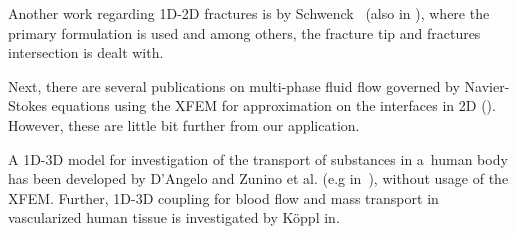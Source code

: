 Another work regarding 1D-2D fractures is by Schwenck~\cite{schwenck_xfem-based_2015} (also in \cite{schwenck_2015}), 
where the primary formulation is used and among others, the fracture tip and fractures intersection is dealt with.

Next, there are several publications on multi-phase fluid flow governed by Navier-Stokes equations using the XFEM for
approximation on the interfaces in 2D (\cite{diez_stable_2013,sauerland_stable_2013}). However, these are
little bit further from our application.

A 1D-3D model for investigation of the transport of substances in a~human body has been developed by D'Angelo 
and Zunino et al. (e.g in~\cite{dangelo_coupling_2008,cattaneo_numerical_2015}), without usage of the XFEM.
Further, 1D-3D coupling for blood flow and mass transport in vascularized human tissue is
investigated by K{\" o}ppl in\cite{koppl_tum_2015}.
